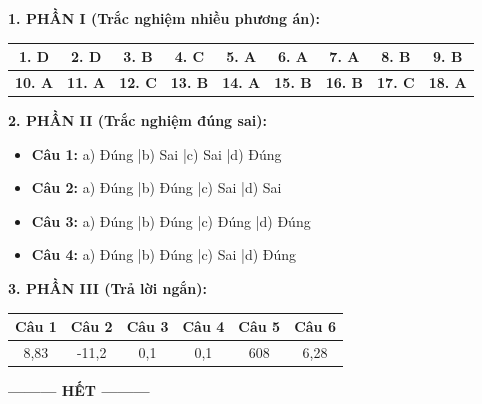 \documentclass[12pt,a4paper]{article}
\begin{document}
\noindent
\textbf{1. PHẦN I (Trắc nghiệm nhiều phương án):}
\begin{center}
\begin{tabular}{|c|c|c|c|c|c|c|c|c|}
\hline
\textbf{1. D} & \textbf{2. D} & \textbf{3. B} & \textbf{4. C} & \textbf{5. A} & \textbf{6. A} & \textbf{7. A} & \textbf{8. B} & \textbf{9. B} \\ \hline
\textbf{10. A} & \textbf{11. A} & \textbf{12. C} & \textbf{13. B} & \textbf{14. A} & \textbf{15. B} & \textbf{16. B} & \textbf{17. C} & \textbf{18. A} \\ \hline
\end{tabular}
\end{center}

\noindent
\textbf{2. PHẦN II (Trắc nghiệm đúng sai):}
\begin{itemize}
	\item \textbf{Câu 1:} a) Đúng \quad|\quad b) Sai \quad|\quad c) Sai \quad|\quad d) Đúng
	\item \textbf{Câu 2:} a) Đúng \quad|\quad b) Đúng \quad|\quad c) Sai \quad|\quad d) Sai
	\item \textbf{Câu 3:} a) Đúng \quad|\quad b) Đúng \quad|\quad c) Đúng \quad|\quad d) Đúng
	\item \textbf{Câu 4:} a) Đúng \quad|\quad b) Đúng \quad|\quad c) Sai \quad|\quad d) Đúng
\end{itemize}

\noindent
\textbf{3. PHẦN III (Trả lời ngắn):}
\begin{center}
\begin{tabular}{|c|c|c|c|c|c|}
\hline
\textbf{Câu 1} & \textbf{Câu 2} & \textbf{Câu 3} & \textbf{Câu 4} & \textbf{Câu 5} & \textbf{Câu 6} \\ \hline
8,83 & -11,2 & 0,1 & 0,1 & 608 & 6,28 \\ \hline
\end{tabular}
\end{center}

\begin{center}
\textbf{--------- HẾT ---------}
\end{center}
\end{document}
